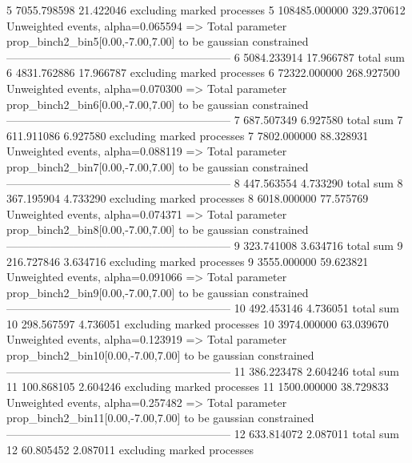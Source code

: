 5          7055.798598     21.422046       excluding marked processes    
5          108485.000000   329.370612      Unweighted events, alpha=0.065594
  => Total parameter prop_binch2_bin5[0.00,-7.00,7.00] to be gaussian constrained
------------------------------------------------------------
6          5084.233914     17.966787       total sum                     
6          4831.762886     17.966787       excluding marked processes    
6          72322.000000    268.927500      Unweighted events, alpha=0.070300
  => Total parameter prop_binch2_bin6[0.00,-7.00,7.00] to be gaussian constrained
------------------------------------------------------------
7          687.507349      6.927580        total sum                     
7          611.911086      6.927580        excluding marked processes    
7          7802.000000     88.328931       Unweighted events, alpha=0.088119
  => Total parameter prop_binch2_bin7[0.00,-7.00,7.00] to be gaussian constrained
------------------------------------------------------------
8          447.563554      4.733290        total sum                     
8          367.195904      4.733290        excluding marked processes    
8          6018.000000     77.575769       Unweighted events, alpha=0.074371
  => Total parameter prop_binch2_bin8[0.00,-7.00,7.00] to be gaussian constrained
------------------------------------------------------------
9          323.741008      3.634716        total sum                     
9          216.727846      3.634716        excluding marked processes    
9          3555.000000     59.623821       Unweighted events, alpha=0.091066
  => Total parameter prop_binch2_bin9[0.00,-7.00,7.00] to be gaussian constrained
------------------------------------------------------------
10         492.453146      4.736051        total sum                     
10         298.567597      4.736051        excluding marked processes    
10         3974.000000     63.039670       Unweighted events, alpha=0.123919
  => Total parameter prop_binch2_bin10[0.00,-7.00,7.00] to be gaussian constrained
------------------------------------------------------------
11         386.223478      2.604246        total sum                     
11         100.868105      2.604246        excluding marked processes    
11         1500.000000     38.729833       Unweighted events, alpha=0.257482
  => Total parameter prop_binch2_bin11[0.00,-7.00,7.00] to be gaussian constrained
------------------------------------------------------------
12         633.814072      2.087011        total sum                     
12         60.805452       2.087011        excluding marked processes    

